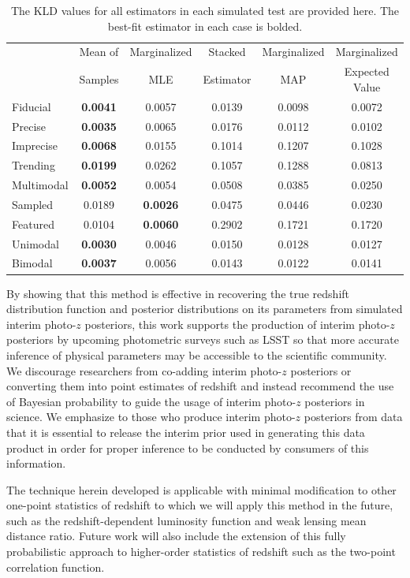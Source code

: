 \documentclass[preprint]{aastex}
\begin{document}
\begin{table}
\begin{tabular}{lccccc}
& Mean of & Marginalized & Stacked & Marginalized & Marginalized\\
& Samples & MLE & Estimator & MAP & Expected Value\\
Fiducial &\textbf{0.0041}&0.0057&0.0139&0.0098&0.0072\\
Precise &\textbf{0.0035}&0.0065&0.0176&0.0112&0.0102\\
Imprecise &\textbf{0.0068}&0.0155&0.1014&0.1207&0.1028\\
Trending &\textbf{0.0199}&0.0262&0.1057&0.1288&0.0813\\
Multimodal &\textbf{0.0052}&0.0054&0.0508&0.0385&0.0250\\
Sampled &0.0189&\textbf{0.0026}&0.0475&0.0446&0.0230\\
Featured &0.0104&\textbf{0.0060}&0.2902&0.1721&0.1720\\
Unimodal &\textbf{0.0030}&0.0046&0.0150&0.0128&0.0127\\
Bimodal &\textbf{0.0037}&0.0056&0.0143&0.0122&0.0141
\end{tabular}
\caption{The KLD values for all estimators in each simulated test are provided 
here.  The best-fit estimator in each case is bolded.}
\label{tab:kld}
\end{table}

By showing that this method is effective in recovering the true redshift 
distribution function and posterior distributions on its parameters from 
simulated interim photo-$z$ posteriors, this work supports the production of 
interim photo-$z$ posteriors by upcoming photometric surveys such as LSST so 
that more accurate inference of physical parameters may be accessible to the 
scientific community.  We discourage researchers from co-adding interim 
photo-$z$ posteriors or converting them into point estimates of redshift and 
instead recommend the use of Bayesian probability to guide the usage of interim 
photo-$z$ posteriors in science.  We emphasize to those who produce interim 
photo-$z$ posteriors from data that it is essential to release the interim 
prior used in generating this data product in order for proper inference to be 
conducted by consumers of this information.

The technique herein developed is applicable with minimal modification to other 
one-point statistics of redshift to which we will apply this method in the 
future, such as the redshift-dependent luminosity function and weak lensing 
mean distance ratio.  Future work will also include the extension of this fully 
probabilistic approach to higher-order statistics of redshift such as the 
two-point correlation function.
\end{document}
